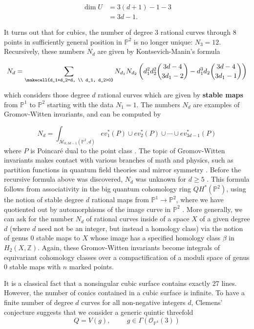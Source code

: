 \documentclass{amsart}
\newcommand{\PP}{\mathbb{P}}\newcommand{\A}{\mathbb{A}}\newcommand{\Z}{\mathbb{Z}}\newcommand{\C}{\mathbb{C}}\newcommand{\N}{\mathbb{N}}\newcommand{\T}{\mathbb{T}}
\begin{document}
\begin{align*}
    \dim U &= 3(d+1) - 1 - 3\\
    &= 3d-1.
\end{align*}




It turns out that for cubics, the number of degree $3$ rational curves through 8 points in sufficiently general position in $\PP^2$ is no longer unique: $N_3=12$. Recursively, these numbers $N_d$ are given by Kontsevich-Manin's \cite{KontsevichManin_1994} formula 

\[ N_d = \sum_{\makecell{d_1+d_2=d, \\ d_1, d_2>0}} N_{d_1} N_{d_2} \left( d_1^2 d_2^2 \binom{3d-4}{3d_1-2} - d_1^3 d_2 \binom{3d-4}{3d_1-1}\right) \] 

 which considers those degree $d$ rational curves which are given by \textbf{stable maps} from $\PP^1$ to $\PP^2$ starting with the data $N_1=1$. The numbers $N_d$ are examples of Gromov-Witten invariants, and can be computed by 

\[ N_d = \int_{\overline{\mathcal{M}}_{0,3d-1}(\PP^2,d)} ev_1^*(P) \cup ev_2^*(P) \cup \cdots \cup ev_{3d-1}^*(P) \] where $P$ is Poincar\'{e} dual to the point class \cite{MSTextbook}. The topic of Gromov-Witten invariants makes contact with various branches of math and physics, such as partition functions in quantum field theories \cite{MSTextbook} and mirror symmetry \cite{coxkatxMSAG}. Before the recursive formula above was discovered, $N_d$ was unknown for $d\geq 5$ \cite{katzenumerative}. This formula follows from associativity in the big quantum cohomology ring $QH^*(\PP^2)$, using the notion of stable degree $d$ rational maps from $\PP^1 \rightarrow \PP^2$, where we have quotiented out by automorphisms of the image curve in $\PP^2$ \cite{kock2006invitation}. More generally, we can ask for the number $N_d$ of rational curves inside of a space $X$ of a given degree $d$ (where $d$ need not be an integer, but instead a homology class) via the notion of genus $0$ stable maps to $X$ whose image has a specified homology class $\beta$ in $H_2(X,\Z)$. Again, these Gromov-Witten invariants become integrals of equivariant cohomology classes over a compactification of a moduli space of genus $0$ stable maps with $n$ marked points. 

It is a classical fact that a nonsingular cubic surface contains exactly 27 lines. However, the number of conics contained in a cubic surface is infinite. To have a finite number of degree $d$ curves for all non-negative integers $d$, Clemens' conjecture suggests that we consider a generic quintic threefold 
\[Q = V(g), \hspace{1cm} g \in \Gamma( \mathcal{O}_{\PP^4}(3)) \]
\end{document}
